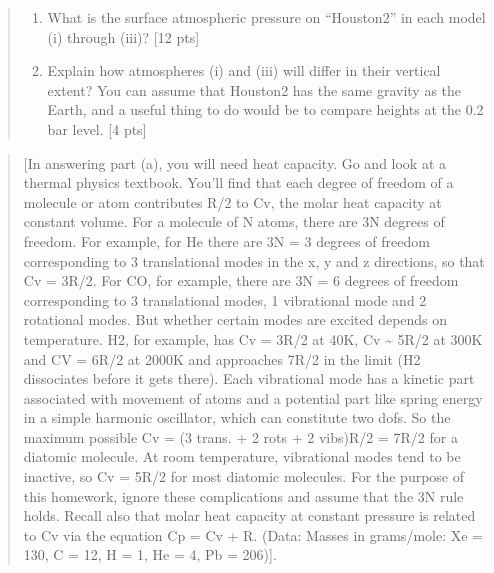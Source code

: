 \documentclass[11pt]{article}
\providecommand{\tightlist}{%
      \setlength{\itemsep}{0pt}\setlength{\parskip}{0pt}}
\begin{document}
\begin{quote}
\begin{enumerate}
\def\labelenumi{(\alph{enumi})}
\tightlist
\item
  What is the surface atmospheric pressure on ``Houston2'' in each model
  (i) through (iii)? {[}12 pts{]}\\
\item
  Explain how atmospheres (i) and (iii) will differ in their vertical
  extent? You can assume that Houston2 has the same gravity as the
  Earth, and a useful thing to do would be to compare heights at the 0.2
  bar level. {[}4 pts{]}
\end{enumerate}
\end{quote}

\begin{quote}
{[}In answering part (a), you will need heat capacity. Go and look at a
thermal physics textbook. You'll find that each degree of freedom of a
molecule or atom contributes R/2 to Cv, the molar heat capacity at
constant volume. For a molecule of N atoms, there are 3N degrees of
freedom. For example, for He there are 3N = 3 degrees of freedom
corresponding to 3 translational modes in the x, y and z directions, so
that Cv = 3R/2. For CO, for example, there are 3N = 6 degrees of freedom
corresponding to 3 translational modes, 1 vibrational mode and 2
rotational modes. But whether certain modes are excited depends on
temperature. H2, for example, has Cv = 3R/2 at 40K, Cv \textasciitilde{}
5R/2 at 300K and CV = 6R/2 at 2000K and approaches 7R/2 in the limit (H2
dissociates before it gets there). Each vibrational mode has a kinetic
part associated with movement of atoms and a potential part like spring
energy in a simple harmonic oscillator, which can constitute two dofs.
So the maximum possible Cv = (3 trans. + 2 rots + 2 vibs)R/2 = 7R/2 for
a diatomic molecule. At room temperature, vibrational modes tend to be
inactive, so Cv = 5R/2 for most diatomic molecules. For the purpose of
this homework, ignore these complications and assume that the 3N rule
holds. Recall also that molar heat capacity at constant pressure is
related to Cv via the equation Cp = Cv + R. (Data: Masses in grams/mole:
Xe = 130, C = 12, H = 1, He = 4, Pb = 206){]}.
\end{quote}
\end{document}
